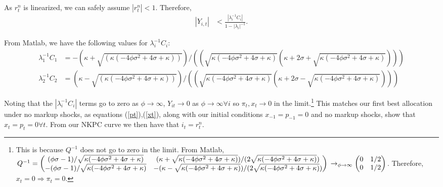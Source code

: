 \documentclass[11pt]{article} %
\begin{document}
As $r_t^n$ is linearized, we can safely assume $|r_t^n|<1$. Therefore,
\begin{align*}
|Y_{i,t}| &< \frac{|\lambda_i^{-1}C_i|}{1-|\lambda_i|^{-1}}.
\end{align*}

From Matlab, we have the following values for $\lambda_i^{-1}C_i$:
\begin{align*}
\lambda_1^{-1}C_1 &= -(\kappa + \sqrt{(\kappa (-4\phi\sigma^2 + 4\sigma + \kappa))})/((\sqrt{\kappa(-4\phi\sigma^2 + 4\sigma +\kappa)}(\kappa + 2\sigma + \sqrt{\kappa(-4\phi\sigma^2 +4\sigma + \kappa)}))) \\
\lambda_2^{-1}C_2 &= (\kappa - \sqrt{(\kappa (-4\phi\sigma^2 + 4\sigma + \kappa))})/((\sqrt{\kappa(-4\phi\sigma^2 + 4\sigma +\kappa)}(\kappa + 2\sigma - \sqrt{\kappa(-4\phi\sigma^2 +4\sigma + \kappa)})))
\end{align*}


Noting that the $|\lambda_i^{-1}C_i|$ terms go to zero as $\phi \rightarrow \infty$, $Y_{it}\rightarrow 0$ as $\phi \rightarrow \infty \forall i$ so $\pi_t,x_t \rightarrow 0$ in the limit.\footnote{This is because $Q^{-1}$ does not go to zero in the limit. From Matlab,\\ $Q^{-1} = \begin{pmatrix}(\phi\sigma - 1)/\sqrt{\kappa(-4\phi\sigma^2 + 4\sigma + \kappa)} & (\kappa + \sqrt{\kappa(-4\phi\sigma^2 + 4\sigma + \kappa)})/(2\sqrt{\kappa(-4\phi\sigma^2 + 4\sigma + \kappa)}) \\ -(\phi\sigma - 1)/\sqrt{\kappa(-4\phi\sigma^2 + 4\sigma + \kappa)} & -(\kappa - \sqrt{\kappa(-4\phi\sigma^2 + 4\sigma + \kappa)})/(2\sqrt{\kappa(-4\phi\sigma^2 + 4\sigma + \kappa)}) \end{pmatrix}\\ \rightarrow_{\phi\rightarrow\infty} \begin{pmatrix}0 &1/2 \\0 & 1/2  \end{pmatrix}$. Therefore, $x_t = 0 \Rightarrow \pi_t = 0.$} This matches our first best allocation under no markup shocks, as equations (\ref{pt}),(\ref{xt}), along with our initial conditions $x_{-1} = p_{-1} = 0$ and no markup shocks, show that $x_t = p_t = 0 \forall t$. From our NKPC curve we then have that $i_t = r_t^n.$
\end{document}
